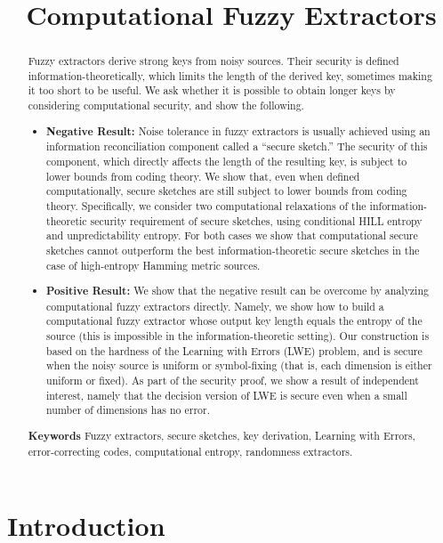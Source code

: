 \documentclass[11pt]{article}
\title{\textbf{Computational Fuzzy Extractors}}
\author{}
\begin{document}
\maketitle


\begin{abstract} 
Fuzzy extractors derive strong keys from noisy sources.  Their
security is defined information-theoretically, which limits the length
of the derived key, sometimes making it too short to be useful. We ask
whether it is possible to obtain longer keys by considering
computational security, and show the following.

\begin{itemize}
\item\textbf{Negative Result:} Noise tolerance in fuzzy extractors is usually
achieved using an information reconciliation component called a ``secure
sketch.'' The security of this component, which directly affects the
length of the resulting key, is subject to lower bounds from coding
theory.  We show that, even when defined computationally, secure
sketches are still subject to lower bounds from coding theory. Specifically, we consider
two computational relaxations of the information-theoretic security requirement of secure sketches, using conditional HILL entropy and unpredictability entropy. For both cases we show  that computational secure sketches cannot outperform the best information-theoretic secure sketches in the case of high-entropy Hamming metric sources.

\item\textbf{Positive Result:} We show that the negative result can be overcome by
analyzing computational fuzzy extractors directly.  Namely, we show
how to build a computational fuzzy extractor whose output key length
equals the entropy of the source (this is impossible in the
information-theoretic setting). Our construction is based on the
hardness of the Learning with Errors (LWE) problem, and is secure when
the noisy source is uniform or symbol-fixing (that is, each dimension
is either uniform or fixed). As part of the security proof, we show a result of independent interest, namely
that the decision version of LWE is secure even when a small number of
dimensions has no error.
\end{itemize}
\textbf{Keywords} Fuzzy extractors, secure sketches, key derivation, Learning with Errors, error-correcting codes, computational entropy, randomness extractors.
\end{abstract}


\section{Introduction}\label{sec:introduction}
\end{document}
